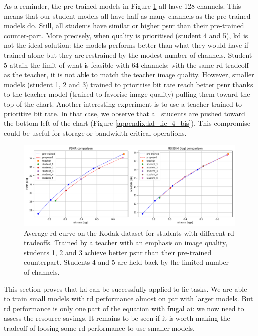 As a reminder, the pre-trained models in Figure \ref{kd_lic_4} all have 128 channels. This means that our student models all have half as many channels as the pre-trained models do. Still, all students have similar or higher \acrshort{psnr} than their pre-trained counter-part. More precisely, when quality is prioritised (student 4 and 5), \acrshort{kd} is not the ideal solution: the models performs better than what they would have if trained alone but they are restrained by the modest number of channels. Student 5 attain the limit of what is feasible with 64 channels: with the same \acrshort{rd} tradeoff as the teacher, it is not able to match the teacher image quality. However, smaller models (student 1, 2 and 3) trained to prioritise bit rate reach better \acrshort{psnr} thanks to the teacher model (trained to favorise image quality) pulling them toward the top of the chart. Another interesting experiment is to use a teacher trained to prioritize bit rate. In that case, we observe that all students are pushed toward the bottom left of the chart (Figure \ref{appendix:kd_lic_4_bis}). This compromise could be useful for storage or bandwidth critical operations.

\begin{figure}
    \centering
    \includegraphics[width=15cm]{../img/kd_lic_rd_lambda_1.png}
    \caption[Average \acrshort{rd} curve on the Kodak dataset for students with different \acrshort{rd} tradeoffs.]{Average \acrshort{rd} curve on the Kodak dataset for students with different \acrshort{rd} tradeoffs. Trained by a teacher with an emphasis on image quality, students 1, 2 and 3 achieve better \acrshort{psnr} than their pre-trained counterpart. Students 4 and 5 are held back by the limited number of channels.}
    \label{kd_lic_4}
\end{figure}

This section proves that \acrshort{kd} can be successfully applied to \acrshort{lic} tasks. We are able to train small models with \acrshort{rd} performance almost on par with larger models. But \acrshort{rd} performance is only one part of the equation with frugal \acrshort{ai}: we now need to assess the resource savings. It remains to be seen if it is worth making the tradeoff of loosing some \acrshort{rd} performance to use smaller models.


